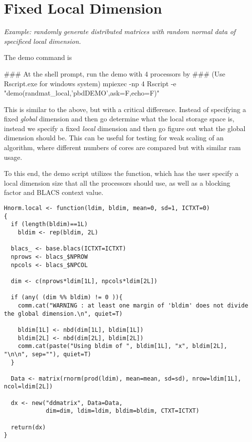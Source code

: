 \section{Fixed Local Dimension}

\emph{Example:  randomly generate distributed matrices with random normal data of specificed local dimension.}

The demo command is
\begin{Command}
### At the shell prompt, run the demo with 4 processors by
### (Use Rscript.exe for windows system)
mpiexec -np 4 Rscript -e "demo(randmat_local,'pbdDEMO',ask=F,echo=F)"
\end{Command}

This is similar to the above, but with a critical difference.  Instead of specifying a fixed \emph{global} dimension and then go determine what the local storage space is, instead we specify a fixed \emph{local} dimension and then go figure out what the global dimension should be.  This can be useful for testing for weak scaling of an algorithm, where different numbers of cores are compared but with similar ram usage.

To this end, the demo script utilizes the  function, which has the user specify a local dimension size that all the processors should use, as well as a blocking factor and BLACS context value.  

\begin{lstlisting}[language=rr,title=Hnorm.local()]
Hnorm.local <- function(ldim, bldim, mean=0, sd=1, ICTXT=0)
{
  if (length(bldim)==1L)
    bldim <- rep(bldim, 2L)
  
  blacs_ <- base.blacs(ICTXT=ICTXT)
  nprows <- blacs_$NPROW
  npcols <- blacs_$NPCOL
  
  dim <- c(nprows*ldim[1L], npcols*ldim[2L])
  
  if (any( (dim %% bldim) != 0 )){
    comm.cat("WARNING : at least one margin of 'bldim' does not divide the global dimension.\n", quiet=T)
    
    bldim[1L] <- nbd(dim[1L], bldim[1L])
    bldim[2L] <- nbd(dim[2L], bldim[2L])
    comm.cat(paste("Using bldim of ", bldim[1L], "x", bldim[2L], "\n\n", sep=""), quiet=T)
  }
  
  Data <- matrix(rnorm(prod(ldim), mean=mean, sd=sd), nrow=ldim[1L], ncol=ldim[2L])
  
  dx <- new("ddmatrix", Data=Data,
            dim=dim, ldim=ldim, bldim=bldim, CTXT=ICTXT)
  
  return(dx)
}
\end{lstlisting}

